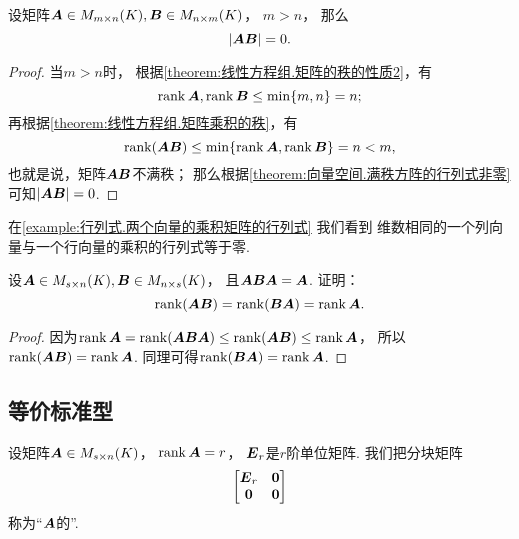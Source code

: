 \begin{theorem}\label{theorem:矩阵乘积的秩.多行少列矩阵与少行多列矩阵的乘积的行列式}
设矩阵\(\boldsymbol{A} \in M_{m \times n}(K),
\boldsymbol{B} \in M_{n \times m}(K)\)，
\(m > n\)，
那么\begin{equation*}
	\abs{\boldsymbol{A} \boldsymbol{B}} = 0.
\end{equation*}
\begin{proof}
当\(m>n\)时，
根据\cref{theorem:线性方程组.矩阵的秩的性质2}，有\begin{equation*}
	\rank\boldsymbol{A},\rank\boldsymbol{B} \leq \min\{m,n\} = n;
\end{equation*}
再根据\cref{theorem:线性方程组.矩阵乘积的秩}，有\begin{equation*}
	\rank(\boldsymbol{A} \boldsymbol{B}) \leq \min\{\rank\boldsymbol{A},\rank\boldsymbol{B}\} = n < m,
\end{equation*}
也就是说，矩阵\(\boldsymbol{A} \boldsymbol{B}\)不满秩；
那么根据\cref{theorem:向量空间.满秩方阵的行列式非零} 可知\(\abs{\boldsymbol{A} \boldsymbol{B}} = 0\).
\end{proof}
\end{theorem}
\begin{remark}
在\cref{example:行列式.两个向量的乘积矩阵的行列式} 我们看到
维数相同的一个列向量与一个行向量的乘积的行列式等于零.
\end{remark}

\begin{example}\label{example:矩阵乘积的秩.矩阵相乘不变秩的特例1}
设\(\boldsymbol{A} \in M_{s \times n}(K), \boldsymbol{B} \in M_{n \times s}(K)\)，
且\(\boldsymbol{A} \boldsymbol{B} \boldsymbol{A} = \boldsymbol{A}\).
证明：\begin{equation*}
	\rank(\boldsymbol{A} \boldsymbol{B})
	= \rank(\boldsymbol{B} \boldsymbol{A})
	= \rank\boldsymbol{A}.
\end{equation*}
\begin{proof}
因为\(
	\rank\boldsymbol{A}
	= \rank(\boldsymbol{A} \boldsymbol{B} \boldsymbol{A})
	\leq \rank(\boldsymbol{A} \boldsymbol{B})
	\leq \rank\boldsymbol{A}
\)，
所以\(\rank(\boldsymbol{A} \boldsymbol{B}) = \rank\boldsymbol{A}\).
同理可得\(\rank(\boldsymbol{B} \boldsymbol{A}) = \rank\boldsymbol{A}\).
\end{proof}
\end{example}

\subsection{等价标准型}
\begin{definition}
设矩阵\(\boldsymbol{A} \in M_{s \times n}(K)\)，
\(\rank\boldsymbol{A} = r\)，
\(\boldsymbol{E}_r\)是\(r\)阶单位矩阵.
我们把分块矩阵\begin{equation*}
	\begin{bmatrix}
		\boldsymbol{E}_r & \boldsymbol0 \\
		\boldsymbol0 & \boldsymbol0
	\end{bmatrix}
\end{equation*}
称为“\(\boldsymbol{A}\)的”.
\end{definition}

